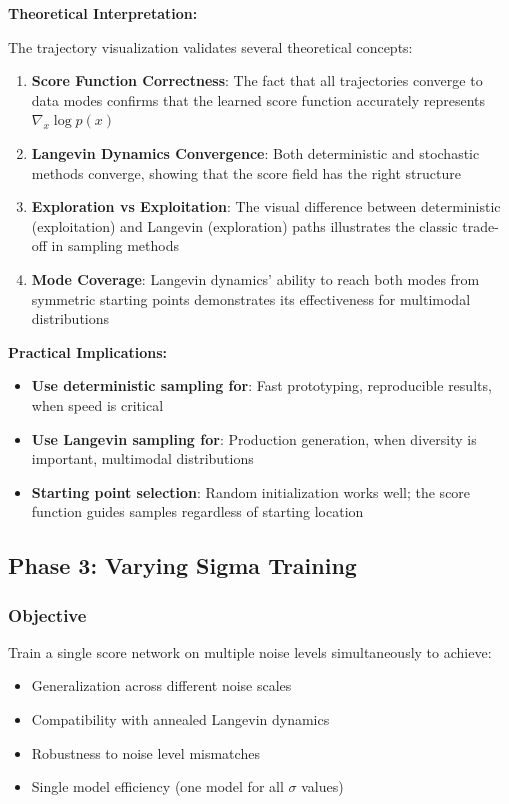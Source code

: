 \documentclass[journal]{IEEEtran}
\begin{document}
\textbf{Theoretical Interpretation:}

The trajectory visualization validates several theoretical concepts:

\begin{enumerate}
    \item \textbf{Score Function Correctness}: The fact that all trajectories converge to data modes confirms that the learned score function accurately represents $\nabla_x \log p(x)$
    
    \item \textbf{Langevin Dynamics Convergence}: Both deterministic and stochastic methods converge, showing that the score field has the right structure
    
    \item \textbf{Exploration vs Exploitation}: The visual difference between deterministic (exploitation) and Langevin (exploration) paths illustrates the classic trade-off in sampling methods
    
    \item \textbf{Mode Coverage}: Langevin dynamics' ability to reach both modes from symmetric starting points demonstrates its effectiveness for multimodal distributions
\end{enumerate}

\textbf{Practical Implications:}

\begin{itemize}
    \item \textbf{Use deterministic sampling for}: Fast prototyping, reproducible results, when speed is critical
    \item \textbf{Use Langevin sampling for}: Production generation, when diversity is important, multimodal distributions
    \item \textbf{Starting point selection}: Random initialization works well; the score function guides samples regardless of starting location
\end{itemize}

\subsection{Phase 3: Varying Sigma Training}

\subsubsection{Objective}

Train a single score network on multiple noise levels simultaneously to achieve:
\begin{itemize}
    \item Generalization across different noise scales
    \item Compatibility with annealed Langevin dynamics
    \item Robustness to noise level mismatches
    \item Single model efficiency (one model for all $\sigma$ values)
\end{itemize}
\end{document}
